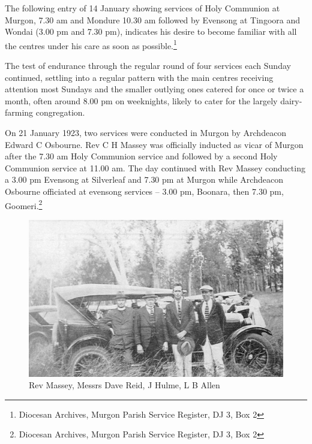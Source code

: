 \smallskip


The following entry of 14 January showing services of Holy Communion at Murgon, 7.30 am and Mondure 10.30 am followed by Evensong at Tingoora and Wondai (3.00 pm and 7.30 pm), indicates his desire to become familiar with all the centres under his care as soon as possible.\footnote{Diocesan Archives, Murgon Parish Service Register, DJ 3, Box 2}


The test of endurance through the regular round of four services each Sunday continued, settling into a regular pattern with the main centres receiving attention most Sundays and the smaller outlying ones catered for once or twice a month, often around 8.00 pm on weeknights, likely to cater for the largely dairy-farming congregation.



On 21 January 1923, two services were conducted in Murgon by Archdeacon Edward C Osbourne. Rev C H Massey was officially inducted as vicar of Murgon after the 7.30 am Holy Communion service and followed by a second Holy Communion service at 11.00 am. The day continued with Rev Massey conducting a 3.00 pm Evensong at Silverleaf and 7.30 pm at Murgon while Archdeacon Osbourne officiated at evensong services -- 3.00 pm, Boonara, then 7.30 pm, Goomeri.\footnote{Diocesan Archives, Murgon Parish Service Register, DJ 3, Box 2}








\begin{figure}
\begin{center}
\includegraphics[width=1.\linewidth,center]{../images/masseyRACQ.jpg}
\caption{Rev Massey, Messrs Dave Reid, J Hulme, L B Allen}
\end{center}
\end{figure}




